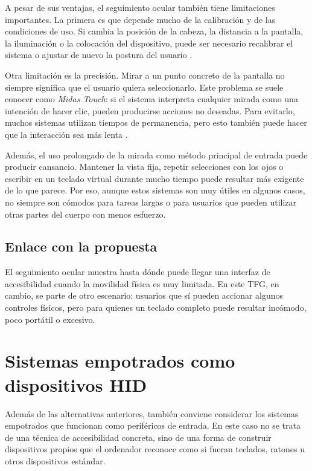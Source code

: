 A pesar de sus ventajas, el seguimiento ocular también tiene limitaciones importantes. La primera es que depende mucho de la calibración y de las condiciones de uso. Si cambia la posición de la cabeza, la distancia a la pantalla, la iluminación o la colocación del dispositivo, puede ser necesario recalibrar el sistema o ajustar de nuevo la postura del usuario \cite{appleEyeTrackingIphone}.

Otra limitación es la precisión. Mirar a un punto concreto de la pantalla no siempre significa que el usuario quiera seleccionarlo. Este problema se suele conocer como \textit{Midas Touch}: si el sistema interpreta cualquier mirada como una intención de hacer clic, pueden producirse acciones no deseadas. Para evitarlo, muchos sistemas utilizan tiempos de permanencia, pero esto también puede hacer que la interacción sea más lenta \cite{rajanna2018gazeAssisted}.

Además, el uso prolongado de la mirada como método principal de entrada puede producir cansancio. Mantener la vista fija, repetir selecciones con los ojos o escribir en un teclado virtual durante mucho tiempo puede resultar más exigente de lo que parece. Por eso, aunque estos sistemas son muy útiles en algunos casos, no siempre son cómodos para tareas largas o para usuarios que pueden utilizar otras partes del cuerpo con menos esfuerzo.

\subsection{Enlace con la propuesta}

El seguimiento ocular muestra hasta dónde puede llegar una interfaz de accesibilidad cuando la movilidad física es muy limitada. En este TFG, en cambio, se parte de otro escenario: usuarios que sí pueden accionar algunos controles físicos, pero para quienes un teclado completo puede resultar incómodo, poco portátil o excesivo.



\section{Sistemas empotrados como dispositivos HID}
\label{sec:sistemas-hid}

Además de las alternativas anteriores, también conviene considerar los sistemas empotrados que funcionan como periféricos de entrada. En este caso no se trata de una técnica de accesibilidad concreta, sino de una forma de construir dispositivos propios que el ordenador reconoce como si fueran teclados, ratones u otros dispositivos estándar.

